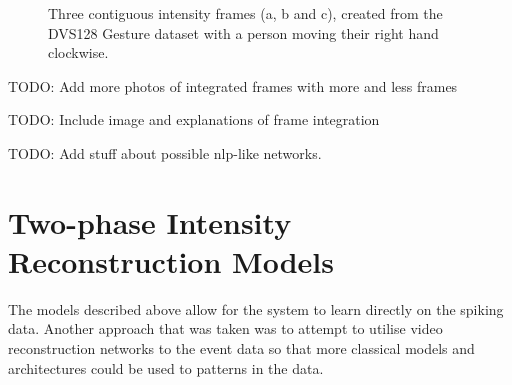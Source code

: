\begin{figure}[htb]%
    \centering
    \qquad
    \qquad
    \caption{Three contiguous intensity frames ({a}, {b} and {c}), created from the DVS128 Gesture dataset with a person moving their right hand clockwise.}%
    \label{fig:dvs128_integrated_frames}%
\end{figure}

\color{red} TODO: Add more photos of integrated frames with more and less frames \color{black}

\color{red} TODO: Include image and explanations of frame integration \color{black}

\color{red} TODO: Add stuff about possible nlp-like networks. \color{black}


\section{Two-phase Intensity Reconstruction Models}

The models described above allow for the system to learn directly on the spiking data. Another approach that was taken was to attempt to utilise video reconstruction networks to the event data so that more classical models and architectures could be used to patterns in the data.

